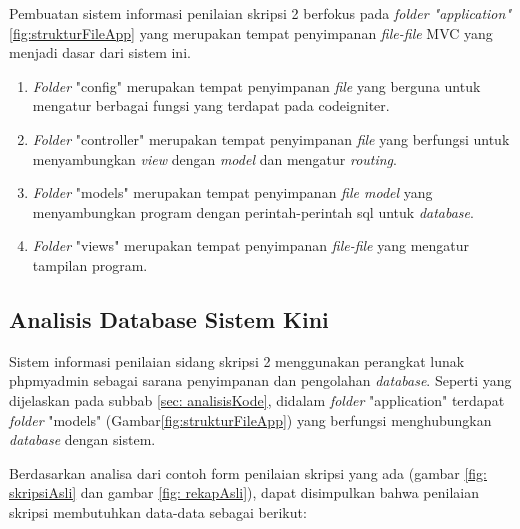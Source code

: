 		
		Pembuatan sistem informasi penilaian skripsi 2 berfokus pada \textit{folder "application"} \ref{fig:strukturFileApp} yang merupakan tempat penyimpanan \textit{file-file} MVC yang menjadi dasar dari sistem ini.
		
		\begin{enumerate}
			\item \textit{Folder} "config" merupakan tempat penyimpanan \textit{file} yang berguna untuk mengatur berbagai fungsi yang terdapat pada codeigniter.
			\item \textit{Folder} "controller" merupakan tempat penyimpanan \textit{file} yang berfungsi untuk menyambungkan \textit{view} dengan \textit{model} dan mengatur \textit{routing}.
			\item \textit{Folder} "models" merupakan tempat penyimpanan \textit{file model} yang menyambungkan program dengan perintah-perintah sql untuk \textit{database}.
			\item \textit{Folder} "views" merupakan tempat penyimpanan \textit{file-file} yang mengatur tampilan program.
		\end{enumerate}
		
		
		
	\subsection{Analisis Database Sistem Kini}
	\label{sub: analisisDatabase}
	
	Sistem informasi penilaian sidang skripsi 2 menggunakan perangkat lunak phpmyadmin sebagai sarana penyimpanan dan pengolahan \textit{database}. Seperti yang dijelaskan pada subbab \ref{sec: analisisKode}, didalam \textit{folder} "application" terdapat \textit{folder} "models" (Gambar\ref{fig:strukturFileApp}) yang berfungsi menghubungkan \textit{database} dengan sistem. 
	
	Berdasarkan analisa dari contoh form penilaian skripsi yang ada (gambar \ref{fig: skripsiAsli} dan gambar \ref{fig: rekapAsli}), dapat disimpulkan bahwa penilaian skripsi membutuhkan data-data sebagai berikut:
		
